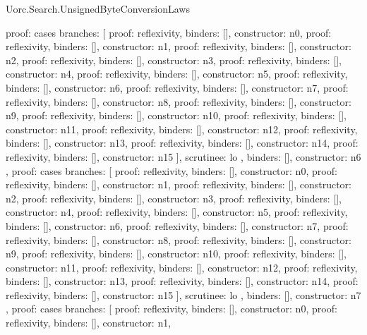 \begin{lexlean}{Uorc.Search.UnsignedByteConversionLaws}
\begin{semanticmodule}
{{{        proof: cases{
          branches: [
            {proof: reflexivity{}, binders: [], constructor: n0},
            {proof: reflexivity{}, binders: [], constructor: n1},
            {proof: reflexivity{}, binders: [], constructor: n2},
            {proof: reflexivity{}, binders: [], constructor: n3},
            {proof: reflexivity{}, binders: [], constructor: n4},
            {proof: reflexivity{}, binders: [], constructor: n5},
            {proof: reflexivity{}, binders: [], constructor: n6},
            {proof: reflexivity{}, binders: [], constructor: n7},
            {proof: reflexivity{}, binders: [], constructor: n8},
            {proof: reflexivity{}, binders: [], constructor: n9},
            {proof: reflexivity{}, binders: [], constructor: n10},
            {proof: reflexivity{}, binders: [], constructor: n11},
            {proof: reflexivity{}, binders: [], constructor: n12},
            {proof: reflexivity{}, binders: [], constructor: n13},
            {proof: reflexivity{}, binders: [], constructor: n14},
            {proof: reflexivity{}, binders: [], constructor: n15}
          ],
          scrutinee: lo
        },
        binders: [],
        constructor: n6
      },
      {
        proof: cases{
          branches: [
            {proof: reflexivity{}, binders: [], constructor: n0},
            {proof: reflexivity{}, binders: [], constructor: n1},
            {proof: reflexivity{}, binders: [], constructor: n2},
            {proof: reflexivity{}, binders: [], constructor: n3},
            {proof: reflexivity{}, binders: [], constructor: n4},
            {proof: reflexivity{}, binders: [], constructor: n5},
            {proof: reflexivity{}, binders: [], constructor: n6},
            {proof: reflexivity{}, binders: [], constructor: n7},
            {proof: reflexivity{}, binders: [], constructor: n8},
            {proof: reflexivity{}, binders: [], constructor: n9},
            {proof: reflexivity{}, binders: [], constructor: n10},
            {proof: reflexivity{}, binders: [], constructor: n11},
            {proof: reflexivity{}, binders: [], constructor: n12},
            {proof: reflexivity{}, binders: [], constructor: n13},
            {proof: reflexivity{}, binders: [], constructor: n14},
            {proof: reflexivity{}, binders: [], constructor: n15}
          ],
          scrutinee: lo
        },
        binders: [],
        constructor: n7
      },
      {
        proof: cases{
          branches: [
            {proof: reflexivity{}, binders: [], constructor: n0},
            {proof: reflexivity{}, binders: [], constructor: n1},
}}}}
\end{semanticmodule}
\end{lexlean}
